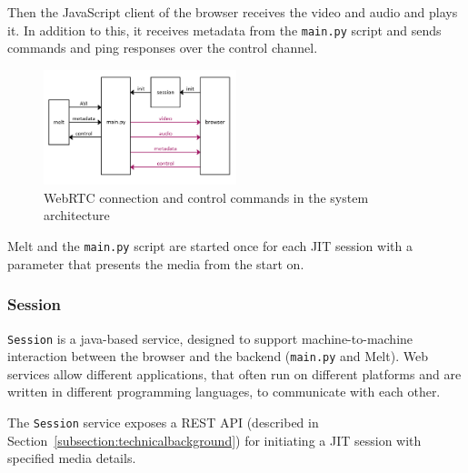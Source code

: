 \documentclass[../MasterThesis.tex]{subfiles}
\begin{document}
Then the JavaScript client of the browser receives the video and audio and plays it. In addition to this, it
receives metadata from the \texttt{main.py} script and sends commands and ping responses over the control channel.


\begin{figure}[H]
	\centering
	\includegraphics[width=0.5\textwidth]{IM_wrtc_control.png}
	\caption[WebRTC and control in the system architecture]{WebRTC connection and control commands in the system architecture}
\end{figure}

Melt and the \texttt{main.py} script are started once for each JIT session with a parameter that presents the media from the start on.


\subsubsection{Session}

\texttt{Session} is a java-based service, designed to support machine-to-machine interaction between the browser and the backend (\texttt{main.py} and Melt). Web services allow different applications, that often run on different platforms and are written in different programming languages, to communicate with each other.~\cite{webservice}

The \texttt{Session} service exposes a REST API (described in Section~\ref{subsection:technicalbackground}) for initiating a JIT session with specified media details. 


\end{document}
